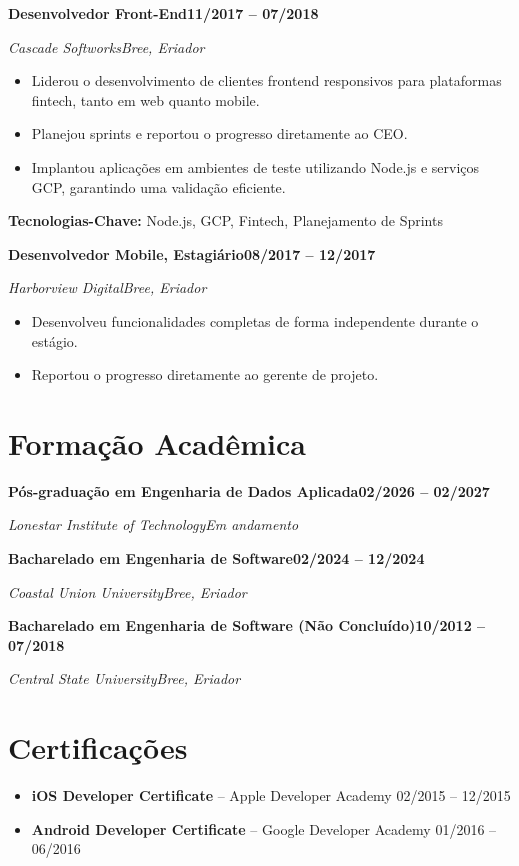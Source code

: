 \documentclass[letterpaper,11pt]{article}
\newlength{\cventrysep}\setlength{\cventrysep}{6pt}  %
\newlength{\cvblocksep}\setlength{\cvblocksep}{4pt}  %
\newcommand{\cvsection}[1]{\section{#1}}
\newcommand{\cventry}[4]{%
  \noindent\normalsize\textbf{#1}\hfill\small\textbf{#4}\par
  \nopagebreak[4]
  \noindent\normalsize\textit{\textcolor{accent}{#2}}\hfill\small\textit{#3}\par
  \nopagebreak[4]
}
\newcommand{\keytech}[1]{\small\textbf{Tecnologias-Chave:} #1\par}
\begin{document}
\vspace{\cventrysep}

\cventry{Desenvolvedor Front-End}{Cascade Softworks}{Bree, Eriador}{11/2017 -- 07/2018}
\begin{itemize}\small
    \item Liderou o desenvolvimento de clientes frontend responsivos para plataformas fintech, tanto em web quanto mobile.
    \item Planejou sprints e reportou o progresso diretamente ao CEO.
    \item Implantou aplicações em ambientes de teste utilizando Node.js e serviços GCP, garantindo uma validação eficiente.
\end{itemize}
\keytech{Node.js, GCP, Fintech, Planejamento de Sprints}

\vspace{\cventrysep}

\cventry{Desenvolvedor Mobile, Estagiário}{Harborview Digital}{Bree, Eriador}{08/2017 -- 12/2017}
\begin{itemize}\small
    \item Desenvolveu funcionalidades completas de forma independente durante o estágio.
    \item Reportou o progresso diretamente ao gerente de projeto.
\end{itemize}

\vspace{\cventrysep}

\cvsection{Formação Acadêmica}

\cventry{Pós-graduação em Engenharia de Dados Aplicada}{Lonestar Institute of Technology}{Em andamento}{02/2026 -- 02/2027}

\vspace{\cvblocksep}

\cventry{Bacharelado em Engenharia de Software}{Coastal Union University}{Bree, Eriador}{02/2024 -- 12/2024}

\vspace{\cvblocksep}

\cventry{Bacharelado em Engenharia de Software (Não Concluído)}{Central State University}{Bree, Eriador}{10/2012 -- 07/2018}

\vspace{\cventrysep}

\cvsection{Certificações}
\begin{itemize}\small
    \item \textbf{iOS Developer Certificate} -- Apple Developer Academy \hfill 02/2015 -- 12/2015
    \item \textbf{Android Developer Certificate} -- Google Developer Academy \hfill 01/2016 -- 06/2016
\end{itemize}
\end{document}
